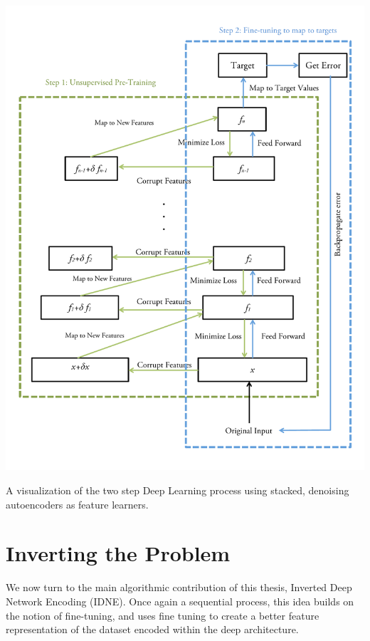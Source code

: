 \begin{FPfigure} 
\begin{center} 
\includegraphics[width=1.2\textwidth]{figures/deeplearning.pdf}
\caption[Short figure name.]{A visualization of the two step Deep Learning process using stacked, denoising autoencoders as feature learners. \label{fig:deeplearning}}
\end{center}
\end{FPfigure}
\afterpage{\clearpage}

\section{Inverting the Problem}

We now turn to the main algorithmic contribution of this thesis, Inverted Deep Network Encoding (IDNE). Once again a sequential process, this idea builds on the notion of fine-tuning, and uses fine tuning to create a better feature representation of the dataset encoded within the deep architecture. 

